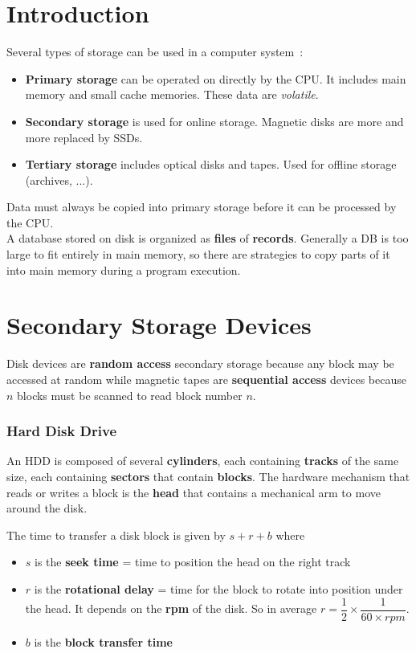 \section{Introduction}
Several types of storage can be used in a computer system~:
\begin{itemize}
    \item \textbf{Primary storage} can be operated on directly by the CPU. It includes main memory and small cache memories. These data are \textit{volatile}.
    \item \textbf{Secondary storage} is used for online storage. Magnetic disks are more and more replaced by SSDs.
    \item \textbf{Tertiary storage} includes optical disks and tapes. Used for offline storage (archives, ...).
\end{itemize}
Data must always be copied into primary storage before it can be processed by the CPU. \\

A database stored on disk is organized as \textbf{files} of \textbf{records}. Generally a DB is too large to fit entirely in main memory, so there are strategies to copy parts of it into main memory during a program execution.



\section{Secondary Storage Devices}

Disk devices are \textbf{random access} secondary storage because any block may be accessed at random while magnetic tapes are \textbf{sequential access} devices because $n$ blocks must be scanned to read block number $n$.

\subsubsection*{Hard Disk Drive}

An HDD is composed of several \textbf{cylinders}, each containing \textbf{tracks} of the same size, each containing \textbf{sectors} that contain \textbf{blocks}. The hardware mechanism that reads or writes a block is the \textbf{head} that contains a mechanical arm to move around the disk. \\

\begin{samepage}

The time to transfer a disk block is given by $s + r + b$ where
\begin{itemize}
    \item $s$ is the \textbf{seek time} = time to position the head on the right track
    \item $r$ is the \textbf{rotational delay} = time for the block to rotate into position under the head. It depends on the \textbf{rpm} of the disk. So in average $r=\dfrac{1}{2} \times \dfrac{1}{60 \times rpm}$.
    \item $b$ is the \textbf{block transfer time}
\end{itemize}
\end{samepage}

